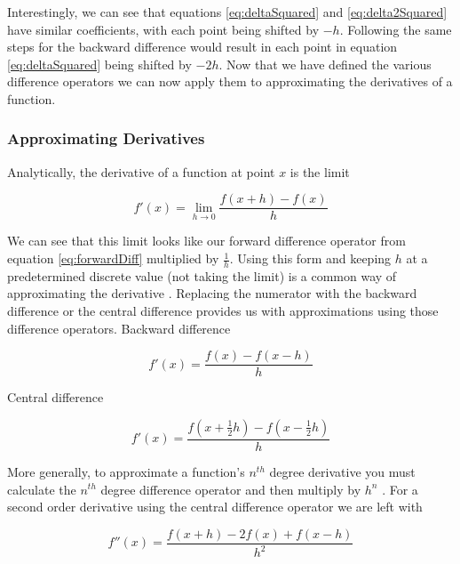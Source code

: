 \documentclass[authoryearcitations]{UoYCSproject}
\begin{document}
Interestingly, we can see that equations \ref{eq:deltaSquared} and \ref{eq:delta2Squared} have similar coefficients,
with each point being shifted by $-h$. Following the same steps for the backward difference would result in each point
in equation \ref{eq:deltaSquared} being shifted by $-2h$. Now that we have defined the various difference operators 
we can now apply them to approximating the derivatives of a function. 

\subsubsection{Approximating Derivatives} 
Analytically, the derivative of a function at point $x$ is the limit

\begin{equation}
  f'(x) = \lim_{h\to0} \frac{f(x + h) - f(x)}{h} \nonumber
\end{equation}

We can see that this limit looks like our forward difference operator from equation \ref{eq:forwardDiff} multiplied
by $\frac{1}{h}$. Using this form and keeping $h$ at a predetermined discrete value (not taking the limit)
is a common way of approximating the derivative \cite{Hamming, wolfram, zhilin}. Replacing the numerator with
the backward difference or the central difference provides us with approximations using those difference operators. 
Backward difference

$$f'(x) = \frac{f(x) - f(x - h)}{h} $$

Central difference

$$f'(x) = \frac{f(x + \frac{1}{2}h) - f(x - \frac{1}{2}h)}{h} $$

More generally, to approximate a function's $n^{th}$ degree derivative you must calculate the $n^{th}$ degree
difference operator and then multiply by $h^n$ \cite{Hamming, weatherley4}. For a second order derivative using
the central difference operator we are left with

\begin{equation}
f''(x) = \frac{f(x + h) - 2f(x) + f(x - h)}{h^2}
\label{eq:2ndDegreeDiffOp}
\end{equation}
\end{document}
